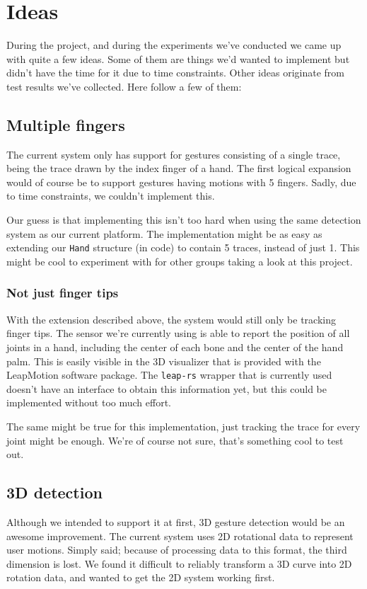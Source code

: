 \documentclass[a4paper]{article}
\begin{document}
  \clearpage

  \section*{Ideas}
  During the project, and during the experiments we've conducted we came up with
  quite a few ideas. Some of them are things we'd wanted to implement but didn't
  have the time for it due to time constraints. Other ideas originate from
  test results we've collected.
  Here follow a few of them:

  \subsection*{Multiple fingers}
  The current system only has support for gestures consisting of a single trace,
  being the trace drawn by the index finger of a hand. The first logical
  expansion would of course be to support gestures having motions with 5
  fingers. Sadly, due to time constraints, we couldn't implement this.

  Our guess is that implementing this isn't too hard when using the same
  detection system as our current platform. The implementation might be as easy
  as extending our \verb_Hand_ structure (in code) to contain 5 traces, instead
  of just 1. This might be cool to experiment with for other groups taking a
  look at this project.

  \subsubsection*{Not just finger tips}
  With the extension described above, the system would still only be tracking
  finger tips. The sensor we're currently using is able to report the position
  of all joints in a hand, including the center of each bone and the center of
  the hand palm. This is easily visible in the 3D visualizer that is provided
  with the LeapMotion software package. The \verb_leap-rs_ wrapper that is
  currently used doesn't have an interface to obtain this information yet,
  but this could be implemented without too much effort.

  The same might be true for this implementation, just tracking the trace for
  every joint might be enough. We're of course not sure, that's something cool
  to test out.

  \subsection*{3D detection}
  Although we intended to support it at first, 3D gesture detection would be an
  awesome improvement. The current system uses 2D rotational data to represent
  user motions. Simply said; because of processing data to this format, the
  third dimension is lost. We found it difficult to reliably transform a 3D
  curve into 2D rotation data, and wanted to get the 2D system working first.
\end{document}
